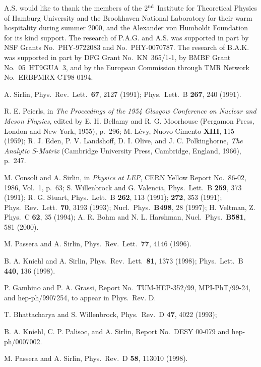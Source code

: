 \documentclass[a4paper,12pt]{article}
\begin{document}
A.S. would like to thank the members of the $2^{\rm nd}$ Institute for
Theoretical Physics of Hamburg University and the Brookhaven National
Laboratory for their warm hospitality during summer 2000, and the Alexander
von Humboldt Foundation for its kind support.  
The research of P.A.G. and A.S. was supported in part by NSF Grants No.\
PHY-9722083 and No.\ PHY-0070787. 
The research of B.A.K. was supported in part by DFG Grant No.\ KN~365/1-1,
by BMBF Grant No.\ 05~HT9GUA~3, and by the European Commission through TMR
Network No.\ ERBFMRX-CT98-0194.

\begin{thebibliography}{99}

A. Sirlin, Phys.\ Rev.\ Lett.\ {\bf67}, 2127 (1991);
Phys.\ Lett.\ B {\bf267}, 240 (1991).
  
R. E. Peierls, in {\it The Proceedings of the 1954 Glasgow Conference on
Nuclear and Meson Physics}, edited by E. H. Bellamy and R. G. Moorhouse
(Pergamon Press, London and New York, 1955), p.~296;
M. L\'evy, Nuovo Cimento {\bf XIII}, 115 (1959); 
R. J. Eden, P. V. Landshoff, D. I. Olive, and J. C. Polkinghorne, {\it The
Analytic S-Matrix} (Cambridge University Press, Cambridge, England, 1966),
p.~247.

M. Consoli and A. Sirlin,
in {\it Physics at LEP}, CERN Yellow Report No.~86-02, 1986, Vol.~1, p.~63;
S. Willenbrock and G. Valencia, Phys.\ Lett.\ B {\bf259}, 373 (1991); 
R. G. Stuart, Phys.\ Lett.\ B {\bf262}, 113 (1991); {\bf272}, 353 (1991); 
Phys.\ Rev.\ Lett.\ {\bf70}, 3193 (1993);
Nucl.\ Phys.\ {\bf B498}, 28 (1997);
H. Veltman, Z. Phys.\ C {\bf62}, 35 (1994);
A. R. Bohm and N. L. Harshman, Nucl.\ Phys.\ {\bf B581}, 581 (2000).

M. Passera and A. Sirlin, Phys.\ Rev.\ Lett.\ {\bf77}, 4146 (1996).

B. A. Kniehl and A. Sirlin, Phys.\ Rev.\ Lett.\ {\bf81}, 1373 (1998);
Phys.\ Lett.\ B {\bf440}, 136 (1998).

P. Gambino and P. A. Grassi,
Report No.\ TUM-HEP-352/99, MPI-PhT/99-24, and hep-ph/9907254, to appear in 
Phys.\ Rev. D.

T. Bhattacharya and S. Willenbrock, Phys.\ Rev.\ D {\bf47}, 4022 (1993);

B. A. Kniehl, C. P. Palisoc, and A. Sirlin,
Report No.\ DESY 00-079 and hep-ph/0007002.

M. Passera and A. Sirlin,
Phys.\ Rev.\ D {\bf58}, 113010 (1998).


\end{thebibliography}
\end{document}
